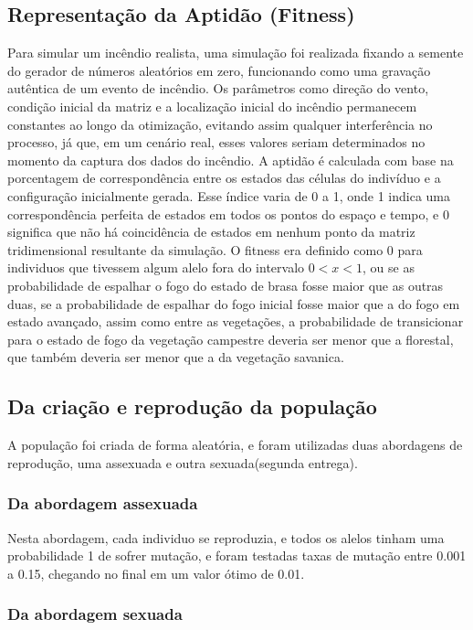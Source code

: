 \documentclass[12pt]{article}
\begin{document}
\subsection{Representação da Aptidão (Fitness)}
Para simular um incêndio realista, uma simulação foi realizada fixando a semente do gerador de números aleatórios em zero, funcionando como uma gravação autêntica de um evento de incêndio. Os parâmetros como direção do vento, condição inicial da matriz e a localização inicial do incêndio permanecem constantes ao longo da otimização, evitando assim qualquer interferência no processo, já que, em um cenário real, esses valores seriam determinados no momento da captura dos dados do incêndio. A aptidão é calculada com base na porcentagem de correspondência entre os estados das células do indivíduo e a configuração inicialmente gerada. Esse índice varia de 0 a 1, onde 1 indica uma correspondência perfeita de estados em todos os pontos do espaço e tempo, e 0 significa que não há coincidência de estados em nenhum ponto da matriz tridimensional resultante da simulação.
O fitness era definido como 0 para individuos que tivessem algum alelo fora do intervalo \(0<x<1\), ou se as probabilidade de espalhar o fogo do estado de brasa fosse maior que as outras duas, se a probabilidade de espalhar do fogo inicial fosse maior que a do fogo em estado avançado, assim como entre as vegetações, a probabilidade de transicionar para o estado de fogo da vegetação campestre deveria ser menor que a florestal, que também deveria ser menor que a da vegetação savanica.
\subsection{Da criação e reprodução da população}
A população foi criada de forma aleatória, e foram utilizadas duas abordagens de reprodução, uma assexuada e outra sexuada(segunda entrega).
\subsubsection{Da abordagem assexuada}
Nesta abordagem, cada individuo se reproduzia, e todos os alelos tinham uma probabilidade 1 de sofrer mutação, e foram testadas taxas de mutação entre 0.001 a 0.15, chegando no final em um valor ótimo de 0.01.
\subsubsection{Da abordagem sexuada}
\end{document}
